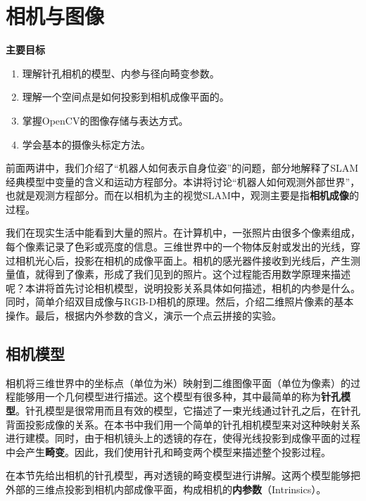\chapter{相机与图像}

\begin{mdframed}  
	\textbf{主要目标}
	\begin{enumerate}[labelindent=0em,leftmargin=1.5em]
		\item 理解针孔相机的模型、内参与径向畸变参数。
		\item 理解一个空间点是如何投影到相机成像平面的。
		\item 掌握OpenCV的图像存储与表达方式。
		\item 学会基本的摄像头标定方法。
	\end{enumerate}
\end{mdframed} 

前面两讲中，我们介绍了“机器人如何表示自身位姿”的问题，部分地解释了SLAM经典模型中变量的含义和运动方程部分。本讲将讨论“机器人如何观测外部世界”，也就是观测方程部分。而在以相机为主的视觉SLAM中，观测主要是指\textbf{相机成像}的过程。

我们在现实生活中能看到大量的照片。在计算机中，一张照片由很多个像素组成，每个像素记录了色彩或亮度的信息。三维世界中的一个物体反射或发出的光线，穿过相机光心后，投影在相机的成像平面上。相机的感光器件接收到光线后，产生测量值，就得到了像素，形成了我们见到的照片。这个过程能否用数学原理来描述呢？本讲将首先讨论相机模型，说明投影关系具体如何描述，相机的内参是什么。同时，简单介绍双目成像与RGB-D相机的原理。然后，介绍二维照片像素的基本操作。最后，根据内外参数的含义，演示一个点云拼接的实验。
\newpage


\newpage

\section{相机模型}
相机将三维世界中的坐标点（单位为米）映射到二维图像平面（单位为像素）的过程能够用一个几何模型进行描述。这个模型有很多种，其中最简单的称为\textbf{针孔模型}。针孔模型是很常用而且有效的模型，它描述了一束光线通过针孔之后，在针孔背面投影成像的关系。在本书中我们用一个简单的针孔相机模型来对这种映射关系进行建模。同时，由于相机镜头上的透镜的存在，使得光线投影到成像平面的过程中会产生\textbf{畸变}。因此，我们使用针孔和畸变两个模型来描述整个投影过程。

在本节先给出相机的针孔模型，再对透镜的畸变模型进行讲解。这两个模型能够把外部的三维点投影到相机内部成像平面，构成相机的\textbf{内参数}（Intrinsics）。

